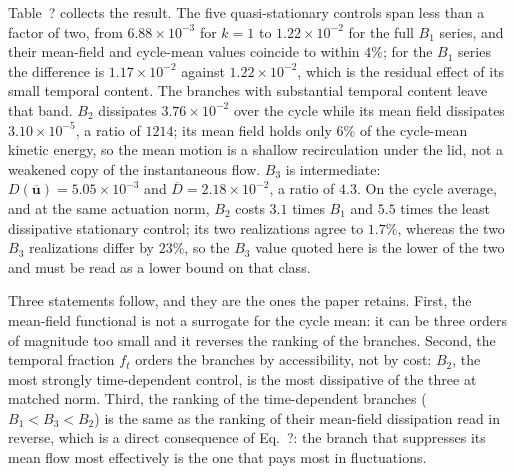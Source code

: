 \documentclass[11pt,a4paper]{article}
\newcommand{\Dbar}{\overline{D}}
\newenvironment{chgdel}{\par\color{red}}{\par\color{black}}
\begin{document}
\begin{chgdel}
Table~? collects the result. The five quasi-stationary controls span
less than a factor of two, from $6.88\times10^{-3}$ for $k=1$ to
$1.22\times10^{-2}$ for the full $B_1$ series, and their mean-field and cycle-mean
values coincide to within $4\%$; for the $B_1$ series the difference is
$1.17\times10^{-2}$ against $1.22\times10^{-2}$, which is the residual effect of
its small temporal content. The branches with substantial temporal content leave
that band. $B_2$ dissipates $3.76\times10^{-2}$ over the cycle while its mean
field dissipates $3.10\times10^{-5}$, a ratio of $1214$; its mean field holds only
$6\%$ of the cycle-mean kinetic energy, so the mean motion is a shallow
recirculation under the lid, not a weakened copy of the instantaneous flow. $B_3$
is intermediate: $D(\overline{\mathbf{u}})=5.05\times10^{-3}$ and
$\Dbar=2.18\times10^{-2}$, a ratio of $4.3$. On the cycle average, and at the same
actuation norm, $B_2$ costs $3.1$ times $B_1$ and $5.5$ times the least
dissipative stationary control; its two realizations agree to $1.7\%$, whereas the
two $B_3$ realizations differ by $23\%$, so the $B_3$ value quoted here is the
lower of the two and must be read as a lower bound on that class.

Three statements follow, and they are the ones the paper retains. First, the
mean-field functional is not a surrogate for the cycle mean: it can be three
orders of magnitude too small and it reverses the ranking of the branches. Second,
the temporal fraction $f_t$ orders the branches by accessibility, not by cost:
$B_2$, the most strongly time-dependent control, is the most dissipative of the
three at matched norm. Third, the ranking of the time-dependent branches
($B_1<B_3<B_2$) is the same as the ranking of their mean-field dissipation read in
reverse, which is a direct consequence of Eq.~?: the branch that
suppresses its mean flow most effectively is the one that pays most in
fluctuations.
\end{chgdel}
\end{document}
